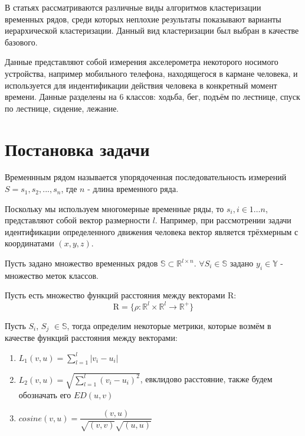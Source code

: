 \documentclass[12pt,twoside]{article}
\begin{document}
        В статьях \cite{WARRENLIAO20051857} \cite{AGHABOZORGI201516} рассматриваются различные виды алгоритмов кластеризации временных рядов,
        среди которых неплохие результаты показывают варианты иерархической кластеризации.
        Данный вид кластеризации был выбран в качестве базового.
        
        Данные \cite{Kwapisz:2011:ARU:1964897.1964918} представляют собой измерения акселерометра некоторого носимого устройства,
        например мобильного телефона, находящегося в кармане человека, и используется для индентификации действия человека в конкретный момент времени.
        Данные разделены на 6 классов: ходьба, бег, подъём по лестнице, спуск по лестнице, сидение, лежание.
        
        
    \section{Постановка задачи}
		
        Временнным рядом называется упорядоченная последовательность измерений\\
        $S = s_1,s_2,...,s_n$,
        где $n$ \-- длина временного ряда.
        
        Поскольку мы используем многомерные временные ряды, то $s_i, i \in 1\dots n$, представляют собой вектор размерности $l$.
        Например, при рассмотрении задачи идентификации определенного движения человека вектор является трёхмерным с координатами $(x, y, z)$.

        Пусть задано множество временных рядов $\mathbb{S} \subset \mathbb{R}^{l \times n}$.
        $\forall S_i \in \mathbb{S}$ задано ${y_i \in \mathbb{Y}}$ \-- множество меток классов.

        Пусть есть множество функций расстояния между векторами $\mathrm{R}$:
        $$
            \mathrm{R} = \{\rho: \mathbb{R}^l \times \mathbb{R}^l \rightarrow \mathbb{R}^+ \}
        $$
				
        Пусть $S_i$, $S_j$ $\in \mathbb{S}$, тогда определим некоторые метрики, которые возмём в качестве функций расстояния между векторами: 
        
        \begin{enumerate}
            \item $L_1(v, u) = {\displaystyle\sum_{l = 1}^{l} |v_i - u_i|}$
            \item $L_2(v, u) = \sqrt{\displaystyle\sum_{l = 1}^{l} (v_i - u_i)^2}$,
                евклидово расстояние, также будем обозначать его $ED(u, v)$
            \item $cosine(v, u) = \dfrac{(v, u)}{\sqrt{(v, v)}\sqrt{(u, u)}}$
        \end{enumerate}
\end{document}
